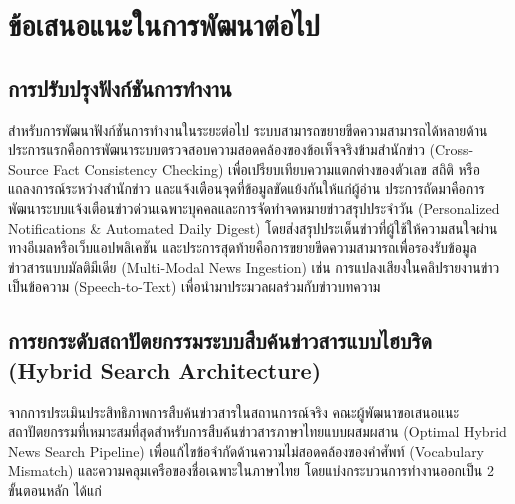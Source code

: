 \section{ข้อเสนอแนะในการพัฒนาต่อไป}

\subsection{การปรับปรุงฟังก์ชันการทำงาน}

สำหรับการพัฒนาฟังก์ชันการทำงานในระยะต่อไป ระบบสามารถขยายขีดความสามารถได้หลายด้าน ประการแรกคือการพัฒนาระบบตรวจสอบความสอดคล้องของข้อเท็จจริงข้ามสำนักข่าว (Cross-Source Fact Consistency Checking) เพื่อเปรียบเทียบความแตกต่างของตัวเลข สถิติ หรือแถลงการณ์ระหว่างสำนักข่าว และแจ้งเตือนจุดที่ข้อมูลขัดแย้งกันให้แก่ผู้อ่าน ประการถัดมาคือการพัฒนาระบบแจ้งเตือนข่าวด่วนเฉพาะบุคคลและการจัดทำจดหมายข่าวสรุปประจำวัน (Personalized Notifications \& Automated Daily Digest) โดยส่งสรุปประเด็นข่าวที่ผู้ใช้ให้ความสนใจผ่านทางอีเมลหรือเว็บแอปพลิเคชัน และประการสุดท้ายคือการขยายขีดความสามารถเพื่อรองรับข้อมูลข่าวสารแบบมัลติมีเดีย (Multi-Modal News Ingestion) เช่น การแปลงเสียงในคลิปรายงานข่าวเป็นข้อความ (Speech-to-Text) เพื่อนำมาประมวลผลร่วมกับข่าวบทความ

\subsection{การยกระดับสถาปัตยกรรมระบบสืบค้นข่าวสารแบบไฮบริด (Hybrid Search Architecture)}

จากการประเมินประสิทธิภาพการสืบค้นข่าวสารในสถานการณ์จริง คณะผู้พัฒนาขอเสนอแนะสถาปัตยกรรมที่เหมาะสมที่สุดสำหรับการสืบค้นข่าวสารภาษาไทยแบบผสมผสาน (Optimal Hybrid News Search Pipeline) เพื่อแก้ไขข้อจำกัดด้านความไม่สอดคล้องของคำศัพท์ (Vocabulary Mismatch) และความคลุมเครือของชื่อเฉพาะในภาษาไทย โดยแบ่งกระบวนการทำงานออกเป็น 2 ขั้นตอนหลัก ได้แก่

